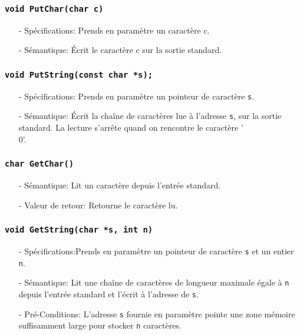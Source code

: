 \documentclass[11pt]{article}
\begin{document}
\subsubsection{\texttt{void PutChar(char c)}}
\begin{itemize}
\item[-] Spécifications: Prends en paramètre un caractère c.
\item[-] Sémantique: Écrit le caractère c sur la sortie standard.
\end{itemize}

\subsubsection{\texttt{void PutString(const char *s);}}
\begin{itemize}
\item[-] Spécifications: Prends en paramètre un pointeur de caractère \texttt{s}.
\item[-] Sémantique:
  Écrit la chaîne de caractères lue à l'adresse \texttt{s}, sur la sortie standard.
  La lecture s'arrête quand on rencontre le caractère '\\0'.
\end{itemize}

\subsubsection{\texttt{char GetChar()}}
\begin{itemize}
\item[-] Sémantique: Lit un caractère depuis l'entrée standard.
\item[-] Valeur de retour: Retourne le caractère lu.
\end{itemize}

\subsubsection{\texttt{void GetString(char *s, int n)}}
\begin{itemize}
\item[-] Spécifications:Prends en paramètre un pointeur de caractère \texttt{s} et un entier \texttt{n}.
\item[-] Sémantique:
  Lit une chaîne de caractères de longueur maximale égale à \texttt{n} depuis l'entrée standard et
  l'écrit à l'adresse de \texttt{s}.
\item[-] Pré-Conditions:
  L'adresse \texttt{s} fournie en paramètre pointe une zone mémoire suffisamment large pour stocker
  \texttt{n} caractères.
\end{itemize}
\end{document}
